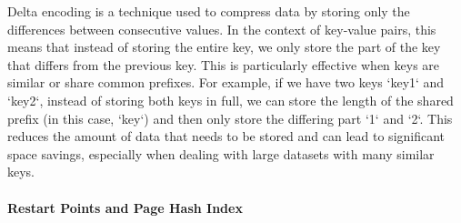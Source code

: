 \documentclass[10pt]{article}
\begin{document}
Delta encoding is a technique used to compress data by storing only the differences between consecutive values. In the context of key-value pairs, this means that instead of storing the entire key, we only store the part of the key that differs from the previous key. This is particularly effective when keys are similar or share common prefixes.
For example, if we have two keys `key1` and `key2`, instead of storing both keys in full, we can store the length of the shared prefix (in this case, `key`) and then only store the differing part `1` and `2`. This reduces the amount of data that needs to be stored and can lead to significant space savings, especially when dealing with large datasets with many similar keys.

\paragraph{Restart Points and Page Hash Index}
\end{document}
